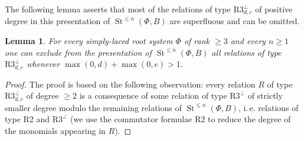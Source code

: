 \documentclass[oneside, 8pt]{amsart}
\newtheorem{lemma}{Lemma}
\theoremstyle{remark}
\theoremstyle{definition}
\numberwithin{lemma}{section}
\numberwithin{prop}{section}
\numberwithin{corollary}{section}
\numberwithin{externaltheorem}{section}
\DeclareMathOperator{\St}{St}
\numberwithin{equation}{section}
\begin{document}
The following lemma asserts that most of the relations of type $\text{R3}^\bot_{d,e}$ of positive degree in this presentation of $\St^{\leq n}(\Phi, B)$ 
 are superfluous and can be omitted.
\begin{lemma}\label{superfluous-relations}
 For every simply-laced root system $\Phi$ of rank $\geq 3$ and every $n \geq 1$ one can exclude from
 the presentation of $\St^{\leq n}(\Phi, B)$ all relations of type $\text{R3}_{d,e}^\bot$ whenever $\max(0,d) + \max(0,e) > 1$.
\end{lemma}
\begin{proof}
The proof is based on the following observation: every relation $R$ of type $\text{R3}^\bot_{d,e}$ of degree $\geq 2$ is a consequence of some relation of type $\text{R3}^\bot$ of strictly smaller degree modulo the remaining relations of $\St^{\leq n}(\Phi, B)$, i.\,e. relations of type R2 and $\text{R3}^{\angle}$ (we use the commutator formulae $\text{R2}$ to reduce the degree of the monomials appearing in $R$).
 

\end{proof}
\end{document}
